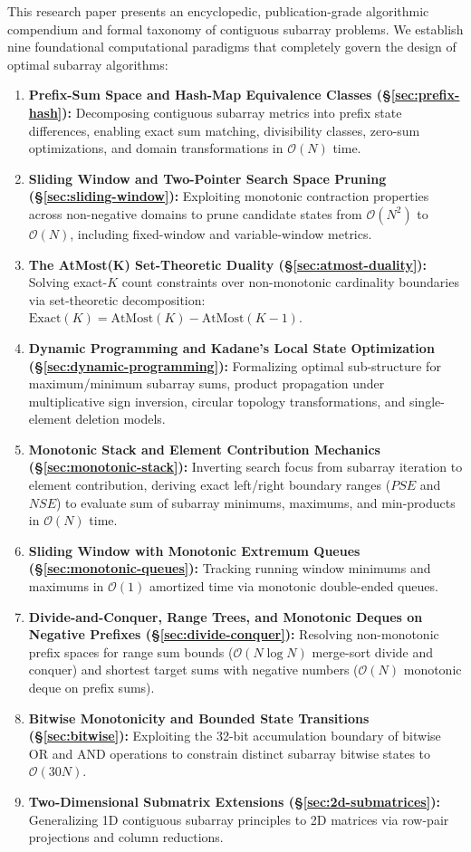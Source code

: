 \documentclass[10pt,journal,compsoc,onecolumn]{IEEEtran}
\begin{document}
This research paper presents an encyclopedic, publication-grade algorithmic compendium and formal taxonomy of contiguous subarray problems. We establish nine foundational computational paradigms that completely govern the design of optimal subarray algorithms:
\begin{enumerate}
    \item \textbf{Prefix-Sum Space and Hash-Map Equivalence Classes (\S\ref{sec:prefix-hash}):} Decomposing contiguous subarray metrics into prefix state differences, enabling exact sum matching, divisibility classes, zero-sum optimizations, and domain transformations in $\mathcal{O}(N)$ time.
    \item \textbf{Sliding Window and Two-Pointer Search Space Pruning (\S\ref{sec:sliding-window}):} Exploiting monotonic contraction properties across non-negative domains to prune candidate states from $\mathcal{O}(N^2)$ to $\mathcal{O}(N)$, including fixed-window and variable-window metrics.
    \item \textbf{The AtMost(K) Set-Theoretic Duality (\S\ref{sec:atmost-duality}):} Solving exact-$K$ count constraints over non-monotonic cardinality boundaries via set-theoretic decomposition: $\text{Exact}(K) = \text{AtMost}(K) - \text{AtMost}(K-1)$.
    \item \textbf{Dynamic Programming and Kadane's Local State Optimization (\S\ref{sec:dynamic-programming}):} Formalizing optimal sub-structure for maximum/minimum subarray sums, product propagation under multiplicative sign inversion, circular topology transformations, and single-element deletion models.
    \item \textbf{Monotonic Stack and Element Contribution Mechanics (\S\ref{sec:monotonic-stack}):} Inverting search focus from subarray iteration to element contribution, deriving exact left/right boundary ranges ($PSE$ and $NSE$) to evaluate sum of subarray minimums, maximums, and min-products in $\mathcal{O}(N)$ time.
    \item \textbf{Sliding Window with Monotonic Extremum Queues (\S\ref{sec:monotonic-queues}):} Tracking running window minimums and maximums in $\mathcal{O}(1)$ amortized time via monotonic double-ended queues.
    \item \textbf{Divide-and-Conquer, Range Trees, and Monotonic Deques on Negative Prefixes (\S\ref{sec:divide-conquer}):} Resolving non-monotonic prefix spaces for range sum bounds ($\mathcal{O}(N \log N)$ merge-sort divide and conquer) and shortest target sums with negative numbers ($\mathcal{O}(N)$ monotonic deque on prefix sums).
    \item \textbf{Bitwise Monotonicity and Bounded State Transitions (\S\ref{sec:bitwise}):} Exploiting the 32-bit accumulation boundary of bitwise OR and AND operations to constrain distinct subarray bitwise states to $\mathcal{O}(30 N)$.
    \item \textbf{Two-Dimensional Submatrix Extensions (\S\ref{sec:2d-submatrices}):} Generalizing 1D contiguous subarray principles to 2D matrices via row-pair projections and column reductions.
\end{enumerate}
\end{document}
